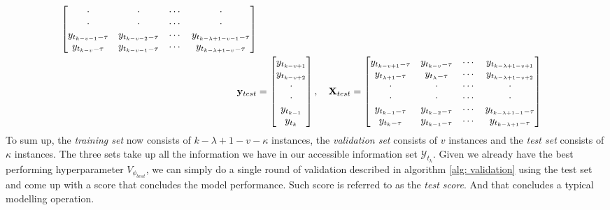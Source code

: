 \begin{align*}
\begin{bmatrix}
        \cdot                     & \cdot                     & \cdots & \cdot                               \\
        \cdot                     & \cdot                     & \cdots & \cdot                               \\
        y_{t_{k-v-1}-\tau}        & y_{t_{k-v-2} - \tau}      & \cdots & y_{t_{k-\lambda+1-v-1}-\tau}        \\
        y_{t_{k-v}-\tau}          & y_{t_{k-v-1} - \tau}      & \cdots & y_{t_{k-\lambda+1-v}-\tau} 
    \end{bmatrix}\\
    \mathbf{y}_{test} &=
    \begin{bmatrix}
        y_{t_{k - v + 1}}  \\
        y_{t_{k - v + 2}}  \\
        \cdot              \\
        \cdot              \\
        y_{t_{k - 1}}      \\
        y_{t_k}
    \end{bmatrix}
    , \quad
    \mathbf{X}_{test} =
    \begin{bmatrix}
        y_{t_{k-v+1} - \tau}     & y_{t_{k-v} - \tau}       & \cdots & y_{t_{k-\lambda+1-v+1}}      \\
        y_{t_{\lambda+1} - \tau} & y_{t_{\lambda} - \tau}   & \cdots & y_{t_{k-\lambda+1-v+2}}      \\
        \cdot                    & \cdot                    & \cdots & \cdot                        \\
        \cdot                    & \cdot                    & \cdots & \cdot                        \\
        y_{t_{k-1} - \tau}       & y_{t_{k-2} - \tau}       & \cdots & y_{t_{k-\lambda+1-1} - \tau} \\
        y_{t_{k} - \tau}         & y_{t_{k-1} - \tau}       & \cdots & y_{t_{k-\lambda+1} - \tau} 
    \end{bmatrix}
\end{align*}
To sum up, the \textit{training set} now consists of $k - \lambda + 1 - v - \kappa$ instances, the \textit{validation set} consists of $v$ instances and the \textit{test set} consists of $\kappa$ instances. The three sets take up all the information we have in our accessible information set $\mathcal{Y}_{t_k}$. Given we already have the best performing hyperparameter $V_{\phi_{best}}$, we can simply do a single round of validation described in algorithm \ref{alg: validation} using the test set and come up with a score that concludes the model performance. Such score is referred to as the \textit{test score}. And that concludes a typical modelling operation.

